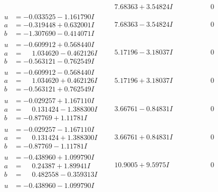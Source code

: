 \documentclass[1p]{elsarticle_modified}
\theoremstyle{definition}
\begin{document}
$$\begin{array}{c|c|c}
 & \phantom{-}7.68363 + 3.54824 I & \phantom{-0.000000 } 0 \\ \hline\begin{aligned}
u &= -0.033525 - 1.161790 I \\
a &= -0.319448 + 0.632001 I \\
b &= -1.307690 - 0.414071 I\end{aligned}
 & \phantom{-}7.68363 - 3.54824 I & \phantom{-0.000000 } 0 \\ \hline\begin{aligned}
u &= -0.609912 + 0.568440 I \\
a &= \phantom{-}1.034620 - 0.462126 I \\
b &= -0.563121 - 0.762549 I\end{aligned}
 & \phantom{-}5.17196 - 3.18037 I & \phantom{-0.000000 } 0 \\ \hline\begin{aligned}
u &= -0.609912 - 0.568440 I \\
a &= \phantom{-}1.034620 + 0.462126 I \\
b &= -0.563121 + 0.762549 I\end{aligned}
 & \phantom{-}5.17196 + 3.18037 I & \phantom{-0.000000 } 0 \\ \hline\begin{aligned}
u &= -0.029257 + 1.167110 I \\
a &= \phantom{-}0.131424 - 1.388300 I \\
b &= -0.87769 + 1.11781 I\end{aligned}
 & \phantom{-}3.66761 - 0.84831 I & \phantom{-0.000000 } 0 \\ \hline\begin{aligned}
u &= -0.029257 - 1.167110 I \\
a &= \phantom{-}0.131424 + 1.388300 I \\
b &= -0.87769 - 1.11781 I\end{aligned}
 & \phantom{-}3.66761 + 0.84831 I & \phantom{-0.000000 } 0 \\ \hline\begin{aligned}
u &= -0.438960 + 1.099790 I \\
a &= \phantom{-}0.24387 + 1.89941 I \\
b &= \phantom{-}0.482558 - 0.359313 I\end{aligned}
 & \phantom{-}10.9005 + 9.5975 I & \phantom{-0.000000 } 0 \\ \hline\begin{aligned}
u &= -0.438960 - 1.099790 I \\

\end{aligned}
\end{array}$$
\end{document}

